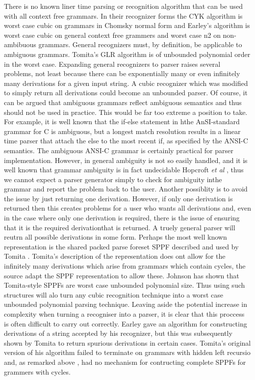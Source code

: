 \begin{isabellebody}
\begin{isamarkuptext}
There is no known liner time parsing or recognition algorithm that can be used with all context free grammars.
In their recognizer forms the CYK algorithm is worst case cubic on grammars in Chomsky normal form and Earley's
algorithm is worst case cubic on general context free grammers and worst case n2 on non-ambibuous grammars.
General recognizers must, by definition, be applicable to ambiguous grammars. Tomita's GLR algorithm is of unbounded
polynomial order in the worst case. Expanding general recognizers to parser raises several problems, not least
because there can be exponentially many or even infinitely many derivations for a given input string. A cubic
recognizer which was modified to simply return all derivations could become an unbounded parser.
Of course, it can be argued that ambiguous grammars reflect ambiguous semantics and thus should not be used in
practice. This would be far too extreme a position to take. For example, it is well known that the if-else
statement in hthe AnSI-standard grammar for C is ambiguous, but a longest match resolution results in a linear
time parser that attach the else to the most recent if, as specified by the ANSI-C semantics. The ambiguous
ANSI-C grammar is certainly practical for parser implementation. However, in general ambiguity is not so easily handled,
and it is well known that grammar ambiguity is in fact undecidable Hopcroft \textit{et al} \cite{Hopcroft:2006}, thus
we cannot expect a parser generator simply to check for ambiguity inthe grammar and report the problem back to the user.
Another possiblity is to avoid the issue by just returning one derivation. However, if only one derivation is returned
then this creates problems for a user who wants all derivations and, even in the case where only one derivation is
required, there is the issue of ensuring that it is the required derivationthat is returned. A truely general parser
will reutrn all possible derivations in some form. Perhaps the most well known representation is the shared packed
parse foreset SPPF described and used by Tomita \cite{Tomita:1985}. Tomita's description of the representation does ont allow
for the infinitely many derivations which arise from grammars which contain cycles, the source adapt the SPPF representation
to allow these. Johnson \cite{Johnson:1991} has shown that Tomita-style SPPFs are worst case unbounded polynomial size. Thus
using such structures will alo turn any cubic recognition technique into a worst case unbounded polynomial parsing technique.
Leaving aside the potential increase in complexity when turning a recogniser into a parser, it is clear that this proccess is often difficult to carry
out correctly. Earley gave an algorithm for constructing derivations of a string accepted by his recognizer,
but this was subsequently shown by Tomita \cite{Tomita:1985} to return spurious derivations in certain cases.
Tomita's original version of his algorithm failed to terminate on grammars with hidden left recursio and, as remarked above
, had no mechanism for contructing complete SPPFs for grammers with cycles.


\end{isamarkuptext}
\end{isabellebody}
